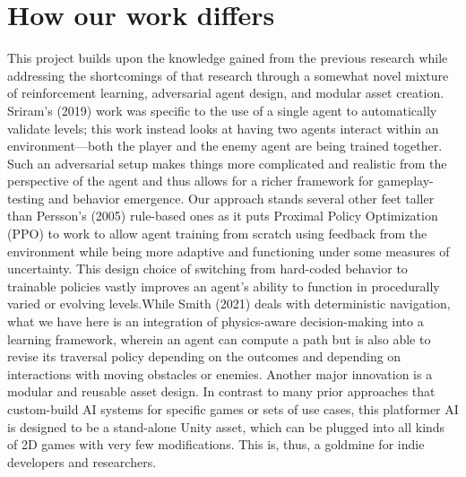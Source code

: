 \documentclass[12pt,oneside,openright,a4paper]{cpe-english-project}
\begin{document}
\section{How our work differs}
This project builds upon the knowledge gained from the previous research while addressing the shortcomings of that research through a somewhat novel mixture of reinforcement learning, adversarial agent design, and modular asset creation. Sriram’s (2019) work was specific to the use of a single agent to automatically validate levels; this work instead looks at having two agents interact within an environment—both the player and the enemy agent are being trained together. Such an adversarial setup makes things more complicated and realistic from the perspective of the agent and thus allows for a richer framework for gameplay-testing and behavior emergence.
Our approach stands several other feet taller than Persson’s (2005) rule-based ones as it puts Proximal Policy Optimization (PPO) to work to allow agent training from scratch using feedback from the environment while being more adaptive and functioning under some measures of uncertainty. This design choice of switching from hard-coded behavior to trainable policies vastly improves an agent’s ability to function in procedurally varied or evolving levels.While Smith (2021) deals with deterministic navigation, what we have here is an integration of physics-aware decision-making into a learning framework, wherein an agent can compute a path but is also able to revise its traversal policy depending on the outcomes and depending on interactions with moving obstacles or enemies. Another major innovation is a modular and reusable asset design. In contrast to many prior approaches that custom-build AI systems for specific games or sets of use cases, this platformer AI is designed to be a stand-alone Unity asset, which can be plugged into all kinds of 2D games with very few modifications. This is, thus, a goldmine for indie developers and researchers.



\end{document}
